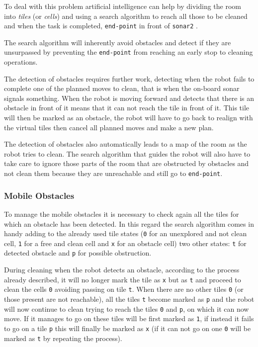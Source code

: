 To deal with this problem artificial intelligence can help by dividing the room into \textit{tiles} (or \textit{cells}) and using a search algorithm to reach all those to be cleaned and when the task is completed, \texttt{end-point} in front of \texttt{sonar2} .

The search algorithm will inherently avoid obstacles and detect if they are unsurpassed by preventing the \texttt{end-point} from reaching an early stop to cleaning operations.

The detection of obstacles requires further work, detecting when the robot fails to complete one of the planned moves to clean, that is when the on-board sonar signals something. When the robot is moving forward and detects that there is an obstacle in front of it means that it can not reach the tile in front of it. This tile will then be marked as an obstacle, the robot will have to go back to realign with the virtual tiles then cancel all planned moves and make a new plan.

The detection of obstacles also automatically leads to a map of the room as the robot tries to clean. The search algorithm that guides the robot will also have to take care to ignore those parts of the room that are obstructed by obstacles and not clean them because they are unreachable and still go to \texttt{end-point}.

\subsubsection{Mobile Obstacles}
To manage the mobile obstacles it is necessary to check again all the tiles for which an obstacle has been detected. In this regard the search algorithm comes in handy adding to the already used tile states (\texttt{0} for an unexplored and not clean cell, \texttt{1} for a free and clean cell and \texttt{x} for an obstacle cell) two other states: \texttt{t} for detected obstacle and \texttt{p} for possible obstruction.

During cleaning when the robot detects an obstacle, according to the process already described, it will no longer mark the tile as \texttt{x} but as \texttt{t} and proceed to clean the cells \texttt{0} avoiding passing on tile \texttt{t}. When there are no other tiles \texttt{0} (or those present are not reachable), all the tiles \texttt{t} become marked as \texttt{p} and the robot will now continue to clean trying to reach the tiles \texttt{0} and \texttt{p}, on which it can now move. If it manages to go on these tiles will be first marked as \texttt{1}, if instead it fails to go on a tile \texttt{p} this will finally be marked as \texttt{x} (if it can not go on one \texttt{0} will be marked as \texttt{t} by repeating the process).

